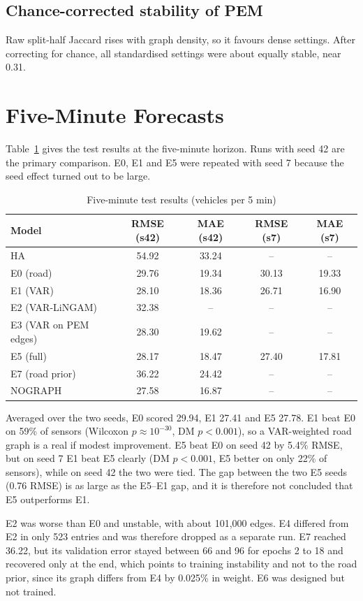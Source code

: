 \documentclass[MTech]{ugthesis}
\begin{document}
\subsection{Chance-corrected stability of PEM}
Raw split-half Jaccard rises with graph density, so it favours dense settings. After correcting for chance, all standardised settings were about equally stable, near 0.31.

\section{Five-Minute Forecasts}
Table~\ref{tab:res5} gives the test results at the five-minute horizon. Runs with seed 42 are the primary comparison. E0, E1 and E5 were repeated with seed 7 because the seed effect turned out to be large.

\begin{table}[h]
\centering
\caption{Five-minute test results (vehicles per 5 min)}
\begin{tabular}{lcccc}
\hline
Model & RMSE (s42) & MAE (s42) & RMSE (s7) & MAE (s7) \\
\hline
HA & 54.92 & 33.24 & -- & -- \\
E0 (road) & 29.76 & 19.34 & 30.13 & 19.33 \\
E1 (VAR) & 28.10 & 18.36 & 26.71 & 16.90 \\
E2 (VAR-LiNGAM) & 32.38 & -- & -- & -- \\
E3 (VAR on PEM edges) & 28.30 & 19.62 & -- & -- \\
E5 (full) & 28.17 & 18.47 & 27.40 & 17.81 \\
E7 (road prior) & 36.22 & 24.42 & -- & -- \\
NOGRAPH & 27.58 & 16.87 & -- & -- \\
\hline
\end{tabular}
\label{tab:res5}
\end{table}

Averaged over the two seeds, E0 scored 29.94, E1 27.41 and E5 27.78. E1 beat E0 on 59\% of sensors (Wilcoxon $p\approx10^{-30}$, DM $p<0.001$), so a VAR-weighted road graph is a real if modest improvement. E5 beat E0 on seed 42 by 5.4\% RMSE, but on seed 7 E1 beat E5 clearly (DM $p<0.001$, E5 better on only 22\% of sensors), while on seed 42 the two were tied. The gap between the two E5 seeds (0.76 RMSE) is as large as the E5--E1 gap, and it is therefore not concluded that E5 outperforms E1.

E2 was worse than E0 and unstable, with about 101,000 edges. E4 differed from E2 in only 523 entries and was therefore dropped as a separate run. E7 reached 36.22, but its validation error stayed between 66 and 96 for epochs 2 to 18 and recovered only at the end, which points to training instability and not to the road prior, since its graph differs from E4 by 0.025\% in weight. E6 was designed but not trained.
\end{document}
